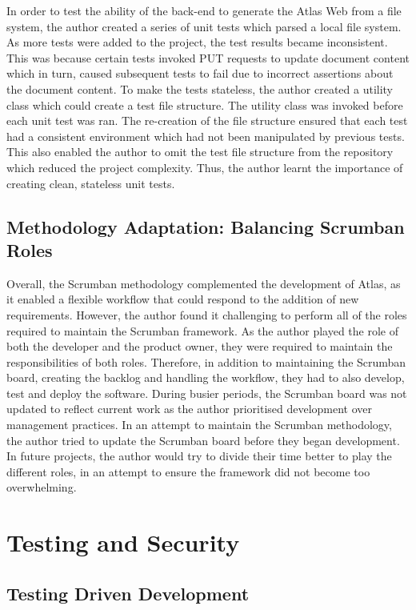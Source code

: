 \documentclass{article}
\begin{document}
In order to test the ability of the back-end to generate the Atlas Web from a file system, the author created a series of unit tests which parsed a local file system. As more tests were added to the project, the test results became inconsistent. This was because certain tests invoked PUT requests to update document content which in turn, caused subsequent tests to fail due to incorrect assertions about the document content. To make the tests stateless, the author created a utility class which could create a test file structure. The utility class was invoked before each unit test was ran. The re-creation of the file structure ensured that each test had a consistent environment which had not been manipulated by previous tests. This also enabled the author to omit the test file structure from the repository which reduced the project complexity. Thus, the author learnt the importance of creating clean, stateless unit tests.

\subsection{Methodology Adaptation: Balancing Scrumban Roles}

Overall, the Scrumban methodology complemented the development of Atlas, as it enabled a flexible workflow that could respond to the addition of new requirements. However, the author found it challenging to perform all of the roles required to maintain the Scrumban framework. As the author played the role of both the developer and the product owner, they were required to maintain the responsibilities of both roles. Therefore, in addition to maintaining the Scrumban board, creating the backlog and handling the workflow, they had to also develop, test and deploy the software. During busier periods, the Scrumban board was not updated to reflect current work as the author prioritised development over management practices. In an attempt to maintain the Scrumban methodology, the author tried to update the Scrumban board before they began development. In future projects, the author would try to divide their time better to play the different roles, in an attempt to ensure the framework did not become too overwhelming.

\newpage
\section{Testing and Security}
\subsection{Testing Driven Development}
\end{document}
